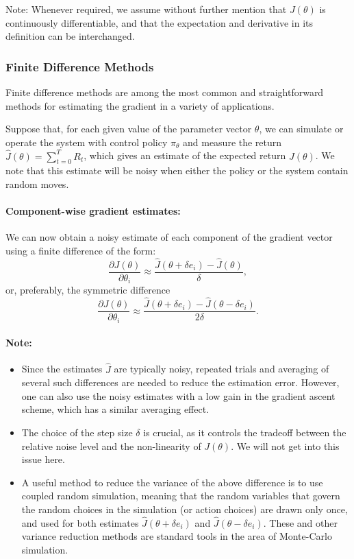 Note: Whenever required, we assume without further mention that $J(\theta )$ is continuously differentiable, and that the expectation and derivative in its definition can be interchanged.

\subsubsection*{Finite Difference Methods}
Finite difference methods are among the most common and straightforward methods for estimating the gradient in a variety of applications.

Suppose that, for each given value of the parameter vector $\theta $, we can simulate or operate the system with control policy ${\pi _\theta }$ and measure the return  $\hat J(\theta ) = \sum\nolimits_{t = 0}^T {{R_t}} $, which gives an estimate of the expected return $J(\theta )$. We note that this estimate will be noisy when either the policy or the system contain random moves.

\paragraph{Component-wise gradient estimates:} We can now obtain a noisy estimate of each component of the gradient vector using a finite difference of the form:
\[\frac{{\partial J(\theta )}}{{\partial {\theta _i}}} \approx \frac{{\hat J(\theta  + \delta {e_i}) - \hat J(\theta )}}{\delta },\]
or, preferably, the symmetric difference
  \[\frac{{\partial J(\theta )}}{{\partial {\theta _i}}} \approx \frac{{\hat J(\theta  + \delta {e_i}) - \hat J(\theta  - \delta {e_i})}}{{2\delta }}.\]
\paragraph{Note:}
\begin{itemize}
  \item Since the estimates $\hat J$ are typically noisy, repeated trials and averaging of several such differences are needed to reduce the estimation error. However, one can also use the noisy estimates with a low gain in the gradient ascent scheme, which has a similar averaging effect.
  \item The choice of the step size $\delta $ is crucial, as it controls the tradeoff between the relative noise level and the non-linearity of $J(\theta )$. We will not get into this issue here.
  \item A useful method to reduce the variance of the above difference is to use coupled random simulation, meaning that the random variables that govern the random choices in the simulation (or action choices) are drawn only once, and used for both estimates $\hat J(\theta  + \delta {e_i})$ and $\hat J(\theta  - \delta {e_i})$. These and other variance reduction methods are standard tools in the area of Monte-Carlo simulation.
\end{itemize}


